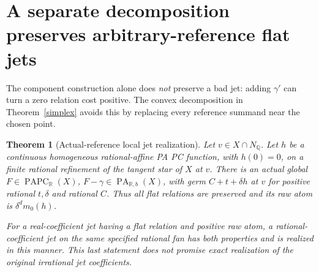\documentclass[11pt]{article}
\newtheorem{theorem}{Theorem}
\newcommand{\R}{\mathbb R}
\newcommand{\Q}{\mathbb Q}
\newcommand{\PA}{\operatorname{PA}}
\newcommand{\PAPC}{\operatorname{PAPC}}
\begin{document}
\section{A separate decomposition preserves arbitrary-reference flat jets}
The component construction alone does \emph{not} preserve a bad
jet: adding $\gamma'$ can turn a zero relation cost positive.
The convex decomposition in Theorem~\ref{simplex} avoids this by
replacing every reference summand near the chosen point.

\begin{theorem}[Actual-reference local jet realization]\label{jets}
Let $v\in X\cap N_\Q$. Let $h$ be a continuous homogeneous
rational-affine PA PC function, with $h(0)=0$, on a finite rational
refinement of the tangent star of $X$ at $v$. There is an actual
global $F\in\PAPC_\R(X)$, $F-\gamma\in\PA_{\R,b}(X)$, with
germ $C+t+\delta h$ at $v$ for positive rational $t,\delta$ and
rational $C$. Thus all flat relations are preserved and its raw
atom is $\delta^d m_0(h)$.

For a real-coefficient jet having a flat relation and positive raw
atom, a rational-coefficient jet on the same specified rational
fan has both properties and is realized in this manner. This last
statement does not promise exact realization of the original
irrational jet coefficients.
\end{theorem}
\end{document}
